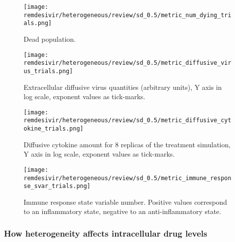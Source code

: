 \begin{figure}[H]
\texttt{[image: remdesivir/heterogeneous/review/sd\_0.5/metric\_num\_dying\_trials.png]}
\caption{Dead population.\label{fig:app:hetero_other_sd:0.5:dead}}
\end{figure}

\begin{figure}[H]
\texttt{[image: remdesivir/heterogeneous/review/sd\_0.5/metric\_diffusive\_virus\_trials.png]}
\caption{Extracellular diffusive virus quantities (arbitrary units), Y axis in log scale, exponent values as tick-marks.\label{fig:app:hetero_other_sd:0.5:diff_vir}}
\end{figure}


\begin{figure}[H]
\texttt{[image: remdesivir/heterogeneous/review/sd\_0.5/metric\_diffusive\_cytokine\_trials.png]}
\caption{Diffusive cytokine amount for 8 replicas of the treatment simulation, Y axis in log scale, exponent values as tick-marks.\label{fig:app:hetero_other_sd:0.5:diff_cyto}}
\end{figure}


\begin{figure}[H]
\texttt{[image: remdesivir/heterogeneous/review/sd\_0.5/metric\_immune\_response\_svar\_trials.png]}
\caption{Immune response state variable number. Positive values correspond to an inflammatory state, negative to an anti-inflammatory state.\label{fig:app:hetero_other_sd:0.5:immune_var}}
\end{figure}


\subsubsection{How heterogeneity affects intracellular drug levels}\label{sup:sec:extra_figures:hetero_other_sd:drug-levels}


